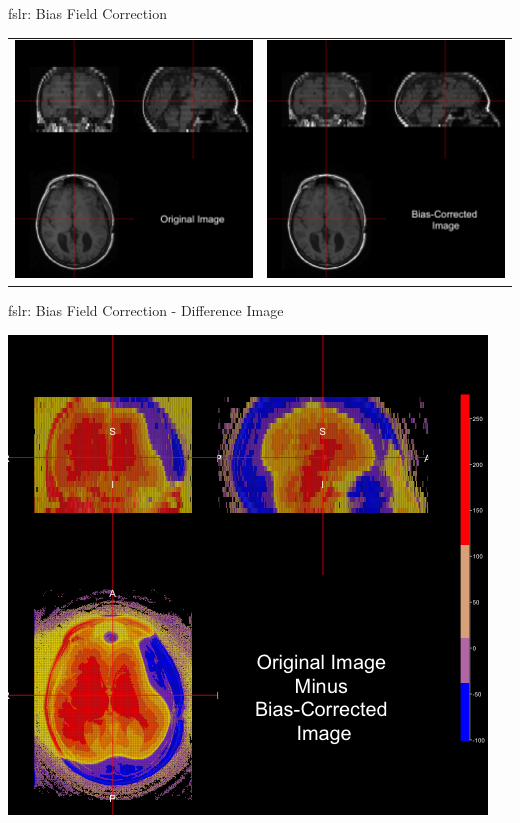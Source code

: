 \documentclass[11pt]{beamer}\usepackage[]{graphicx}\usepackage[]{color}
\begin{document}
\begin{frame}[fragile]{fslr: Bias Field Correction}

\begin{tabular}{cc}
\includegraphics[width=0.5\linewidth]{Orig_Image.png} & \includegraphics[width=0.5\linewidth]{FAST_Image.png}
\end{tabular}

\end{frame}


\begin{frame}[fragile]{fslr: Bias Field Correction - Difference Image}

\includegraphics[width=0.5\linewidth]{FAST_Diff_Image.png}

\end{frame}
\end{document}
